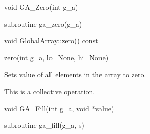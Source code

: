 \documentclass[12pt]{article}
\begin{document}

\begin{capi}
\begin{ccode}
void GA_Zero(int g_a)
\end{ccode}
\begin{funcargs}
\end{funcargs}
\end{capi}

\begin{fapi}
\begin{fcode}
subroutine ga_zero(g_a)
\end{fcode}
\begin{funcargs}
\end{funcargs}
\end{fapi}

\begin{cxxapi}
\begin{cxxcode}
void GlobalArray::zero() const
\end{cxxcode}
\end{cxxapi}

\begin{pyapi}
\begin{pycode}
zero(int g_a, lo=None, hi=None)
\end{pycode}
\end{pyapi}
\gcoll

\begin{desc}

Sets value of all elements in the array to zero.

This is a collective operation.

\end{desc}


\begin{capi}
\begin{ccode}
void GA_Fill(int g_a, void *value)
\end{ccode}
\begin{funcargs}
\end{funcargs}
\end{capi}

\begin{fapi}
\begin{fcode}
subroutine ga_fill(g_a, s)
\end{fcode}
\begin{funcargs}
\end{funcargs}
\end{fapi}
\end{document}
